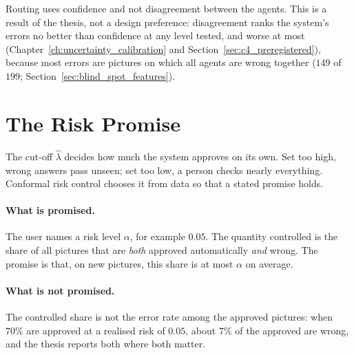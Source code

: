 Routing uses confidence and not disagreement between the agents. This is a result of the thesis, not a design preference: disagreement ranks the system's errors no better than confidence at any level tested, and worse at most (Chapter~\ref{ch:uncertainty_calibration} and Section~\ref{sec:c4_preregistered}), because most errors are pictures on which all agents are wrong together ($149$ of $199$; Section~\ref{sec:blind_spot_features}).

\section{The Risk Promise}
\label{sec:risk_promise_explained}

The cut-off $\hat\lambda$ decides how much the system approves on its own. Set too high, wrong answers pass unseen; set too low, a person checks nearly everything. Conformal risk control \cite{crc2024} chooses it from data so that a stated promise holds.

\paragraph{What is promised.} The user names a risk level $\alpha$, for example $0.05$. The quantity controlled is the share of all pictures that are \emph{both} approved automatically \emph{and} wrong. The promise is that, on new pictures, this share is at most $\alpha$ on average.

\paragraph{What is not promised.} The controlled share is not the error rate among the approved pictures: when $70\%$ are approved at a realised risk of $0.05$, about $7\%$ of the approved are wrong, and the thesis reports both where both matter.

